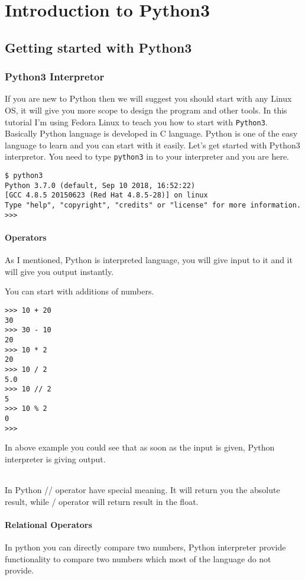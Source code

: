 \documentclass[letterpaper,12pt]{book}
\begin{document}
\tableofcontents
\part{Introduction to Python3}

\chapter{Getting started with Python3}

\section{Python3 Interpretor}
If you are new to Python then we will suggest you should start with any Linux OS, it will give you more scope to design the program and other tools. In this tutorial I'm using Fedora Linux to teach you how to start with \texttt{Python3}. Basically Python language is developed in C language. Python is one of the easy language to learn and you can start with it easily.
Let's get started with Python3 interpretor. You need to type \texttt{python3} in to your interpreter and you are here.

\begin{lstlisting}
$ python3
Python 3.7.0 (default, Sep 10 2018, 16:52:22) 
[GCC 4.8.5 20150623 (Red Hat 4.8.5-28)] on linux
Type "help", "copyright", "credits" or "license" for more information.
>>>
\end{lstlisting}
\subsection{Operators}
As I mentioned, Python is interpreted language, you will give input to it and it will give you output instantly.

You can start with additions of numbers.
\begin{lstlisting}
>>> 10 + 20
30
>>> 30 - 10
20
>>> 10 * 2
20
>>> 10 / 2
5.0
>>> 10 // 2
5
>>> 10 % 2
0
>>> 
\end{lstlisting}
In above example you could see that as soon as the input is given, Python interpreter is giving output.

\paragraph{}
In Python // operator have special meaning. It will return you the absolute result, while / operator will return result in the float.

\subsection{Relational Operators}
In python you can directly compare two numbers, Python interpreter provide functionality to compare two numbers which most of the language do not provide.
\end{document}
